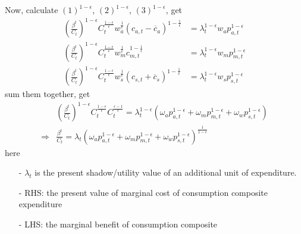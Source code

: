 \documentclass[10pt,landscape,a4paper]{article}
\let\bar\overline
\begin{document}
\begin{multicols*}{3}

Now, calculate $(1)^{1-\epsilon}$, $(2)^{1-\epsilon}$, $(3)^{1-\epsilon}$, get 
\begin{align*}
    \left(\frac{\beta^t}{C_t}\right)^{1-\epsilon}C_t^{\frac{1-\epsilon}{\epsilon}}w_a^{\frac{1}{\epsilon}}\left(c_{a,t}-\bar{c}_a\right)^{1-\frac{1}{\epsilon}} & =\lambda_t^{1-\epsilon} w_a p_{a,t}^{1-\epsilon}\\
    \left(\frac{\beta^t}{C_t}\right)^{1-\epsilon}C_t^{\frac{1-\epsilon}{\epsilon}}w_m^{\frac{1}{\epsilon}}c_{m,t}^{1-\frac{1}{\epsilon}} & =\lambda_t^{1-\epsilon} w_m p_{m,t}^{1-\epsilon}\\ \left(\frac{\beta^t}{C_t}\right)^{1-\epsilon}C_t^{\frac{1-\epsilon}{\epsilon}}w_s^{\frac{1}{\epsilon}}\left(c_{s,t}+\bar{c}_s\right)^{1-\frac{1}{\epsilon}} & =\lambda_t^{1-\epsilon} w_s p_{s,t}^{1-\epsilon}
\end{align*}
sum them together, get
\begin{align*}
    & \left(\frac{\beta^t}{C_t}\right)^{1-\epsilon} C_t^{\frac{1-\epsilon}{\epsilon}}C_t^{\frac{\epsilon-1}{\epsilon}} = \lambda_t^{1-\epsilon}\left( \omega_ap_{a,t}^{1-\epsilon} +\omega_m p_{m,t}^{1-\epsilon} +\omega_w p_{s,t}^{1-\epsilon} \right)\\
    \Rightarrow & \frac{\beta^t}{C_t} = \lambda_t \left( \omega_ap_{a,t}^{1-\epsilon} +\omega_m p_{m,t}^{1-\epsilon} +\omega_w p_{s,t}^{1-\epsilon} \right)^{\frac{1}{1-\epsilon}}
\end{align*}
here
\begin{itemize}
    \item[-] $\lambda_t$ is the present shadow/utility value of an additional unit of expenditure.
    \item[-] RHS: the present value of marginal cost of consumption composite expenditure
    \item[-] LHS: the marginal benefit of consumption composite
\end{itemize}


\end{multicols*}
\end{document}
